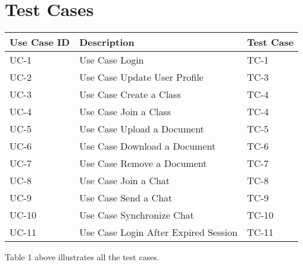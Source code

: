 \documentclass{scrreprt}
\begin{document}
\section{Test Cases}
\begin{center}
\begin{tabularx}{\linewidth}{lXX}
Use Case ID & Description & Test Case \\ \hline
UC-1 & Use Case Login & TC-1 \\ \hline
UC-2 & Use Case Update User Profile & TC-3 \\ \hline
UC-3 & Use Case Create a Class & TC-4 \\ \hline
UC-4 & Use Case Join a Class & TC-4 \\ \hline
UC-5 & Use Case Upload a Document & TC-5 \\ \hline
UC-6 & Use Case Download a Document & TC-6 \\ \hline
UC-7 & Use Case Remove a Document & TC-7 \\ \hline
UC-8 & Use Case Join a Chat & TC-8 \\ \hline
UC-9 & Use Case Send a Chat & TC-9 \\ \hline
UC-10 & Use Case Synchronize Chat & TC-10 \\ \hline
UC-11 & Use Case Login After Expired Session & TC-11 \\ \hline
\end{tabularx}
\end{center}

Table 1 above illustrates all the test cases.
\end{document}
